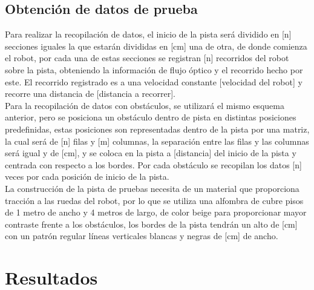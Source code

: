 \documentclass{iccmemoria}
\begin{document}
\section{Obtención de datos de prueba}

Para realizar la recopilación de datos, el inicio de la pista será dividido en [n] secciones iguales la que estarán divididas en [cm] una de otra, de donde comienza el robot, por cada una de estas secciones se registran [n] recorridos del robot sobre la pista, obteniendo la información de flujo óptico y el recorrido hecho por este. El recorrido registrado es a una velocidad constante [velocidad del robot] y recorre una distancia de [distancia a recorrer].\\
 
Para la recopilación de datos con obstáculos, se utilizará el mismo esquema anterior, pero se posiciona un obstáculo dentro de pista en distintas posiciones predefinidas, estas posiciones son representadas dentro de la pista por una matriz, la cual será de [n] filas y [m] columnas, la separación entre las filas y las columnas será igual y de [cm], y se coloca en la pista a [distancia] del inicio de la pista y centrada con respecto a los bordes. Por cada obstáculo se recopilan los datos [n] veces por cada posición de inicio de la pista.\\
 
La construcción de la pista de pruebas necesita de un material que proporciona tracción a las ruedas del robot, por lo que se utiliza una alfombra de cubre pisos de 1 metro de ancho y 4 metros de largo, de color beige para proporcionar mayor contraste frente a los obstáculos, los bordes de la pista tendrán un alto de [cm] con un patrón regular líneas verticales blancas y negras de [cm] de ancho.

\chapter{Resultados}
\end{document}
